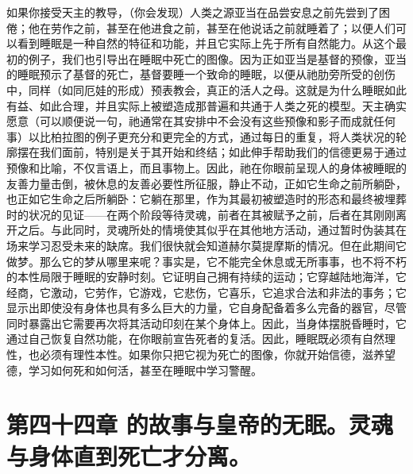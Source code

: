 如果你接受天主的教导，（你会发现）人类之源亚当在品尝安息之前先尝到了困倦；他在劳作之前，甚至在他进食之前，甚至在他说话之前就睡着了；以便人们可以看到睡眠是一种自然的特征和功能，并且它实际上先于所有自然能力。从这个最初的例子，我们也引导出在睡眠中死亡的图像。因为正如亚当是基督的预像，亚当的睡眠预示了基督的死亡，基督要睡一个致命的睡眠，以便从祂肋旁所受的创伤中，同样（如同厄娃的形成）预表教会，真正的活人之母。这就是为什么睡眠如此有益、如此合理，并且实际上被塑造成那普遍和共通于人类之死的模型。天主确实愿意（可以顺便说一句，祂通常在其安排中不会没有这些预像和影子而成就任何事）以比柏拉图的例子更充分和更完全的方式，通过每日的重复，将人类状况的轮廓摆在我们面前，特别是关于其开始和终结；如此伸手帮助我们的信德更易于通过预像和比喻，不仅言语上，而且事物上。因此，祂在你眼前呈现人的身体被睡眠的友善力量击倒，被休息的友善必要性所征服，静止不动，正如它生命之前所躺卧，也正如它生命之后所躺卧：它躺在那里，作为其最初被塑造时的形态和最终被埋葬时的状况的见证——在两个阶段等待灵魂，前者在其被赋予之前，后者在其刚刚离开之后。与此同时，灵魂所处的情境使其似乎在其他地方活动，通过暂时伪装其在场来学习忍受未来的缺席。我们很快就会知道赫尔莫提摩斯的情况。但在此期间它做梦。那么它的梦从哪里来呢？事实是，它不能完全休息或无所事事，也不将不朽的本性局限于睡眠的安静时刻。它证明自己拥有持续的运动；它穿越陆地海洋，它经商，它激动，它劳作，它游戏，它悲伤，它喜乐，它追求合法和非法的事务；它显示出即使没有身体也具有多么巨大的力量，它自身配备着多么完备的器官，尽管同时暴露出它需要再次将其活动印刻在某个身体上。因此，当身体摆脱昏睡时，它通过自己恢复自然功能，在你眼前宣告死者的复活。因此，睡眠既必须有自然理性，也必须有理性本性。如果你只把它视为死亡的图像，你就开始信德，滋养望德，学习如何死和如何活，甚至在睡眠中学习警醒。\par


\section{第四十四章 的故事与皇帝的无眠。灵魂与身体直到死亡才分离。}

